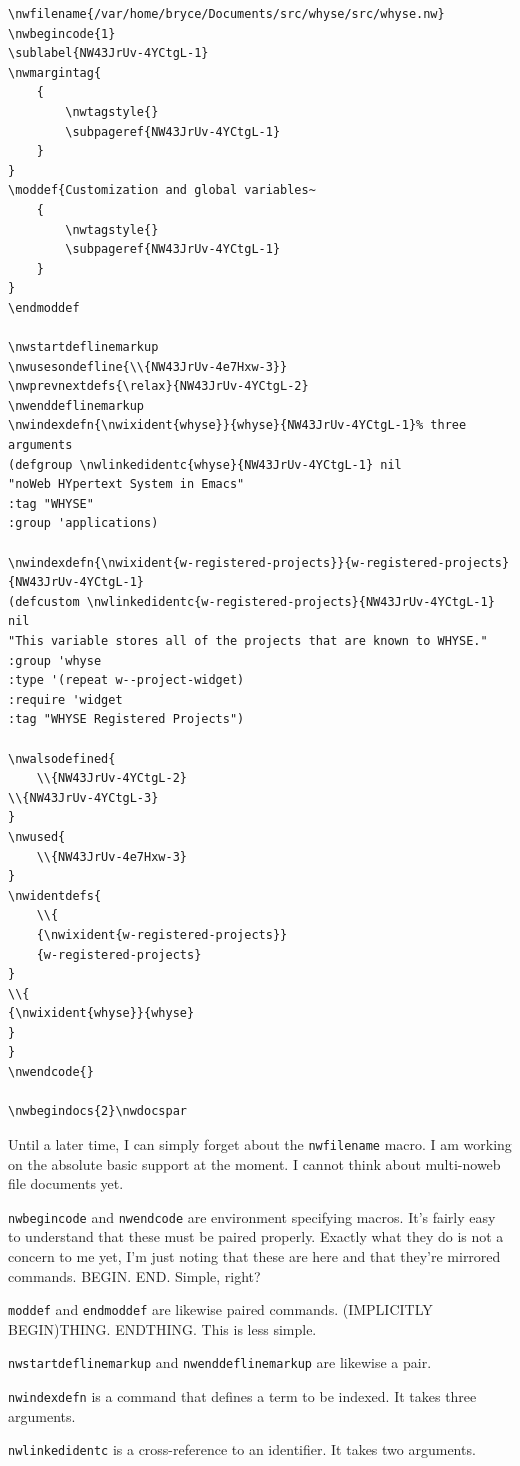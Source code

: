 \begin{verbatim}
\nwfilename{/var/home/bryce/Documents/src/whyse/src/whyse.nw}
\nwbegincode{1}
\sublabel{NW43JrUv-4YCtgL-1}
\nwmargintag{
    {
        \nwtagstyle{}
        \subpageref{NW43JrUv-4YCtgL-1}
    }
}
\moddef{Customization and global variables~
    {
        \nwtagstyle{}
        \subpageref{NW43JrUv-4YCtgL-1}
    }
}
\endmoddef

\nwstartdeflinemarkup
\nwusesondefline{\\{NW43JrUv-4e7Hxw-3}}
\nwprevnextdefs{\relax}{NW43JrUv-4YCtgL-2}
\nwenddeflinemarkup
\nwindexdefn{\nwixident{whyse}}{whyse}{NW43JrUv-4YCtgL-1}% three arguments
(defgroup \nwlinkedidentc{whyse}{NW43JrUv-4YCtgL-1} nil
"noWeb HYpertext System in Emacs"
:tag "WHYSE"
:group 'applications)

\nwindexdefn{\nwixident{w-registered-projects}}{w-registered-projects}{NW43JrUv-4YCtgL-1}
(defcustom \nwlinkedidentc{w-registered-projects}{NW43JrUv-4YCtgL-1} nil
"This variable stores all of the projects that are known to WHYSE."
:group 'whyse
:type '(repeat w--project-widget)
:require 'widget
:tag "WHYSE Registered Projects")

\nwalsodefined{
    \\{NW43JrUv-4YCtgL-2}
\\{NW43JrUv-4YCtgL-3}
}
\nwused{
    \\{NW43JrUv-4e7Hxw-3}
}
\nwidentdefs{
    \\{
    {\nwixident{w-registered-projects}}
    {w-registered-projects}
}
\\{
{\nwixident{whyse}}{whyse}
}
}
\nwendcode{}

\nwbegindocs{2}\nwdocspar
\end{verbatim}

Until a later time, I can simply forget about the \texttt{nwfilename}
macro. I am working on the absolute basic support at the moment. I
cannot think about multi-noweb file documents yet.

\texttt{nwbegincode} and \texttt{nwendcode} are environment specifying
macros. It's fairly easy to understand that these must be paired
properly. Exactly what they do is not a concern to me yet, I'm just
noting that these are here and that they're mirrored commands. BEGIN.
END. Simple, right?

\texttt{moddef} and \texttt{endmoddef} are likewise paired commands.
(IMPLICITLY BEGIN)THING. ENDTHING. This is less simple.

\texttt{nwstartdeflinemarkup} and \texttt{nwenddeflinemarkup} are
likewise a pair.

\texttt{nwindexdefn} is a command that defines a term to be indexed. It
takes three arguments.

\texttt{nwlinkedidentc} is a cross-reference to an identifier. It takes
two arguments.
